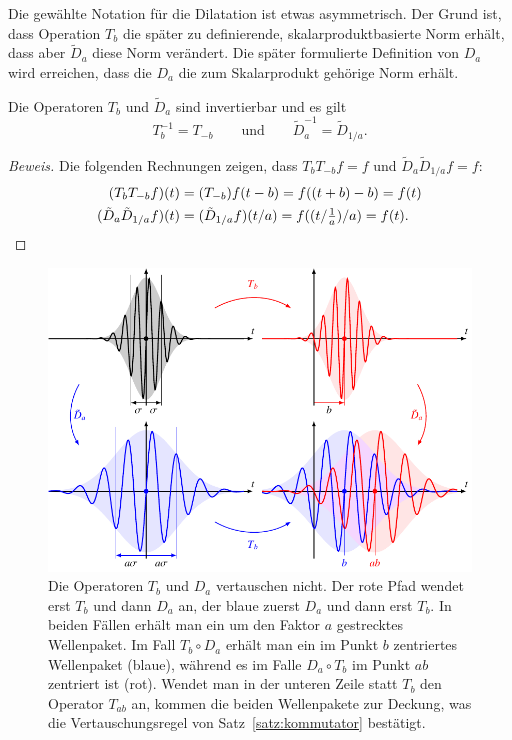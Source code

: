 Die gewählte Notation für die Dilatation ist etwas asymmetrisch.
Der Grund ist, dass Operation $T_b$ die später zu definierende,
skalarproduktbasierte Norm erhält, dass aber $\tilde{D}_a$ diese Norm
verändert.
Die später formulierte Definition von $D_a$ wird erreichen, dass 
die $D_a$ die zum Skalarprodukt gehörige Norm erhält.

\begin{satz}
\label{geometrie:satz:inverse}
Die Operatoren $T_b$ und $\tilde{D}_a$ sind invertierbar und es gilt
\[
T_b^{-1} = T_{-b}
\qquad\text{und}\qquad
\tilde{D}_a^{-1} = \tilde{D}_{1/a}.
\]
\end{satz}

\begin{proof}[Beweis]
Die folgenden Rechnungen zeigen, dass $T_bT_{-b}f=f$ und $\tilde{D}_a\tilde{D}_{1/a}f=f$:
\begin{align*}
(T_bT_{-b}f)(t)
&=
(T_{-b})f(t-b)
=
f((t+b)-b)
=
f(t)
\\
(\tilde{D}_a\tilde{D}_{1/a}f)(t)
&=
(\tilde{D}_{1/a}f)(t/a)
=
f((t/{\textstyle\frac1a})/a)
=
f(t).
\qedhere
\end{align*}
\end{proof}

\begin{figure}
\centering
\includegraphics[width=\hsize]{chapters/1-geometrie/images/kommutator.pdf}
\caption{Die Operatoren $T_b$ und $D_a$ vertauschen nicht.
Der rote Pfad wendet erst $T_b$ und dann $D_a$ an, der blaue zuerst
$D_a$ und dann erst $T_b$.
In beiden Fällen erhält man ein um den Faktor $a$ gestrecktes
Wellenpaket.
Im Fall $T_b\circ D_a$ erhält man ein im Punkt $b$ zentriertes Wellenpaket
(blaue), während es im Falle $D_a\circ T_b$ im Punkt $ab$ zentriert ist (rot).
Wendet man in der unteren Zeile statt $T_b$ den Operator $T_{ab}$ an, 
kommen die beiden Wellenpakete zur Deckung, was die Vertauschungsregel
von Satz~\ref{satz:kommutator} bestätigt.
\label{geometrie:kommutator:image}}
\end{figure}

